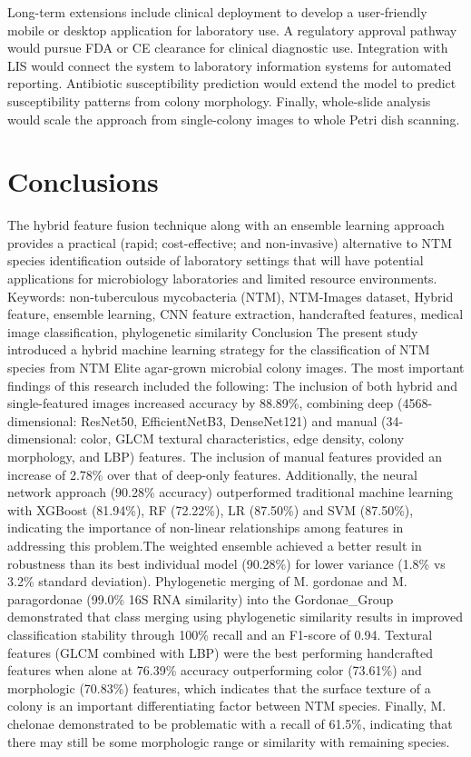 \documentclass[journal,article,submit,pdftex,moreauthors]{Definitions/mdpi}
\begin{document}
Long-term extensions include clinical deployment to develop a user-friendly mobile or 
desktop application for laboratory use. A regulatory approval pathway would pursue 
FDA or CE clearance for clinical diagnostic use. Integration with LIS would connect the 
system to laboratory information systems for automated reporting. Antibiotic 
susceptibility prediction would extend the model to predict susceptibility patterns from 
colony morphology. Finally, whole-slide analysis would scale the approach from 
single-colony images to whole Petri dish scanning.  

\section{Conclusions}

The hybrid feature fusion technique along with an ensemble learning approach provides a 
practical (rapid; cost-effective; and non-invasive) alternative to NTM species identification 
outside of laboratory settings that will have potential applications for microbiology laboratories 
and limited resource environments. Keywords: non-tuberculous mycobacteria (NTM), 
NTM-Images dataset, Hybrid feature, ensemble learning, CNN feature extraction, handcrafted 
features, medical image classification, phylogenetic similarity Conclusion The present study 
introduced a hybrid machine learning strategy for the classification of NTM species from NTM 
Elite agar-grown microbial colony images. The most important findings of this research included 
the following: The inclusion of both hybrid and single-featured images increased accuracy by 
88.89\%, combining deep (4568-dimensional: ResNet50, EfficientNetB3, DenseNet121) and 
manual (34-dimensional: color, GLCM textural characteristics, edge density, colony morphology, 
and LBP) features. The inclusion of manual features provided an increase of 2.78\% over 
that of deep-only features. Additionally, the neural network approach (90.28\% accuracy) 
outperformed traditional machine learning with XGBoost (81.94\%), RF (72.22\%), LR (87.50\%) 
and SVM (87.50\%), indicating the importance of non-linear relationships among features in 
addressing this problem.The weighted ensemble achieved a better result in robustness than its 
best individual model (90.28\%) for lower variance (1.8\% vs 3.2\% standard deviation). Phylogenetic merging of M. gordonae and M. paragordonae (99.0\% 16S RNA similarity) into the Gordonae\_Group demonstrated that class merging using phylogenetic similarity results in improved classification stability through 100\% recall and an F1-score of 0.94. Textural features (GLCM combined with LBP) were the best performing handcrafted features when alone at 76.39\% accuracy outperforming color 
(73.61\%) and morphologic (70.83\%) features, which indicates that the surface texture of a 
colony is an important differentiating factor between NTM species. Finally, 
M. chelonae demonstrated to be problematic with a recall of 61.5\%, indicating that there may 
still be some morphologic range or similarity with remaining species.
\end{document}
